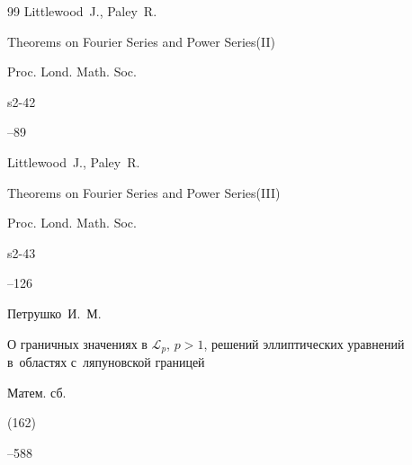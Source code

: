 \begin{thebibliography}{99}
\by Littlewood~J., Paley~R.

\paper Theorems on Fourier Series and Power Series(II)

\jour Proc. Lond. Math. Soc.


\vol s2-42


--89






\by Littlewood~J., Paley~R.

\paper Theorems on Fourier Series and Power Series(III)

\jour Proc. Lond. Math. Soc.


\vol s2-43


--126







\by Петрушко~И.~М.

\paper О граничных значениях в $\mathscr L_p$, $p>1$, решений эллиптических уравнений в~областях с~ляпуновской границей

\jour Матем. сб.


(162)


--588









\end{thebibliography}
